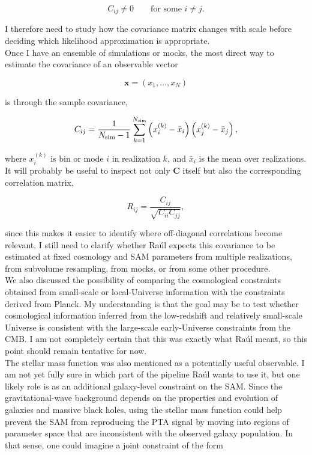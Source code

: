 \documentclass[10.9pt,a4paper,twoside]{article}
\begin{document}
\[
C_{ij} \neq 0
\qquad
\text{for some } i\neq j.
\]

I therefore need to study how the covariance matrix changes with scale before deciding which likelihood approximation is appropriate. \\

Once I have an ensemble of simulations or mocks, the most direct way to estimate the covariance of an observable vector

\[
\mathbf{x}
=
(x_1,\ldots,x_N)
\]

is through the sample covariance,

\[
C_{ij}
=
\frac{1}{N_{\rm sim}-1}
\sum_{k=1}^{N_{\rm sim}}
\left(
x_i^{(k)}-\bar{x}_i
\right)
\left(
x_j^{(k)}-\bar{x}_j
\right),
\]

where $x_i^{(k)}$ is bin or mode $i$ in realization $k$, and $\bar{x}_i$ is the mean over realizations. \\

It will probably be useful to inspect not only $\mathbf{C}$ itself but also the corresponding correlation matrix,

\[
R_{ij}
=
\frac{C_{ij}}
{\sqrt{C_{ii}C_{jj}}},
\]

since this makes it easier to identify where off-diagonal correlations become relevant. I still need to clarify whether Raúl expects this covariance to be estimated at fixed cosmology and SAM parameters from multiple realizations, from subvolume resampling, from mocks, or from some other procedure. \\

We also discussed the possibility of comparing the cosmological constraints obtained from small-scale or local-Universe information with the constraints derived from Planck. My understanding is that the goal may be to test whether cosmological information inferred from the low-redshift and relatively small-scale Universe is consistent with the large-scale early-Universe constraints from the CMB. I am not completely certain that this was exactly what Raúl meant, so this point should remain tentative for now. \\

The stellar mass function was also mentioned as a potentially useful observable. I am not yet fully sure in which part of the pipeline Raúl wants to use it, but one likely role is as an additional galaxy-level constraint on the SAM. Since the gravitational-wave background depends on the properties and evolution of galaxies and massive black holes, using the stellar mass function could help prevent the SAM from reproducing the PTA signal by moving into regions of parameter space that are inconsistent with the observed galaxy population. In that sense, one could imagine a joint constraint of the form
\end{document}
